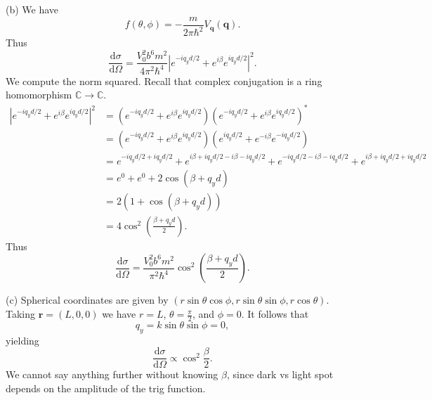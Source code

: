 \documentclass[11pt, letterpaper]{article}
\begin{document}
(b) We have
\[
	f(\theta ,\phi )=-\frac{m}{2\pi \hbar ^2} V_\mathbf{q} (\mathbf{q} )
.\]
Thus
\[
	\frac{\mathrm{d}\sigma }{\mathrm{d}\Omega } =\frac{V_0^2b^6m^2}{4\pi ^2 \hbar ^4} \left| e^{-iq_yd/2} +e^{i\beta } e^{iq_yd/2}  \right| ^2
.\]
We compute the norm squared. Recall that complex conjugation is a ring homomorphism $\mathbb{C} \to \mathbb{C} $.
\begin{align*}
	\left| e^{-iq_yd/2} +e^{i\beta } e^{iq_yd/2}  \right| ^2 &= \left( e^{-iq_yd/2} +e^{i\beta } e^{iq_yd/2} \right)\left( e^{-iq_yd/2} +e^{i\beta } e^{iq_yd/2} \right)^*\\
								 &=\left( e^{-iq_yd/2} +e^{i\beta } e^{iq_yd/2} \right)\left( e^{iq_yd/2} +e^{-i\beta } e^{-iq_yd/2} \right)\\
								 &=e^{-iq_yd/2 + iq_yd/2} + e^{i\beta +iq_yd/2 - i\beta -iq_yd/2} +e^{-iq_yd/2 - i\beta -iq_yd/2} +e^{i\beta +iq_yd/2 + iq_yd/2} \\
								 &=e^0+e^0+2 \cos \left( \beta +q_yd \right) \\
								 &=2\left( 1+\cos \left( \beta +q_yd \right)  \right) \\
								 &=4 \cos ^2\left( \frac{\beta +q_yd}{2}  \right) 
.\end{align*}
Thus
\[
	\frac{\mathrm{d}\sigma }{\mathrm{d}\Omega } =\frac{V_0^2b^6m^2}{\pi ^2\hbar ^4} \cos ^2\left( \frac{\beta +q_yd}{2}  \right) 
.\]

(c) Spherical coordinates are given by $(r \sin \theta \cos \phi ,r \sin \theta \sin \phi , r \cos \theta )$. Taking $\mathbf{r} =(L,0,0)$ we have $r=L$, $\theta=\frac{\pi }{2} $, and $\phi =0$. It follows that
\[
	q_y=k \sin \theta \sin \phi =0,
\]
yielding
\[
	\frac{\mathrm{d}\sigma }{\mathrm{d}\Omega } \propto \cos ^2\frac{\beta }{2} 
.\]
We cannot say anything further without knowing $\beta $, since dark vs light spot depends on the amplitude of the trig function.
\end{document}

